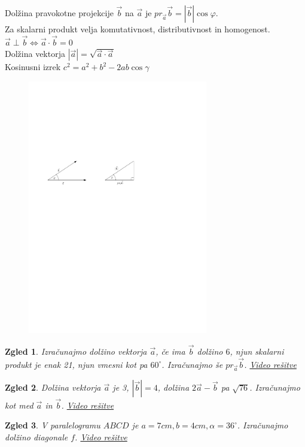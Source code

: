 \documentclass{article}
\newtheorem*{zgled}{Zgled}
\begin{document}
Dolžina pravokotne projekcije $\vec{b}$ na $\vec{a}$ je $pr_{\vec{a}}\vec{b}=|\vec{b}|\cos\varphi$.\\

Za skalarni produkt velja komutativnost, distributivnost in homogenost.\\

$\vec{a} \perp\vec{b} \iff \vec{a}\cdot\vec{b}=0$\\

Dolžina vektorja $|\vec{a}|=\sqrt{\vec{a}\cdot\vec{a}}$\\

Kosinusni izrek $c^2=a^2+b^2-2ab\cos\gamma$

\begin{figure}[H]
\includegraphics[width=0.7\textwidth]{skalarnu.produkt.pdf}
\centering
\end{figure}

\begin{zgled}
    Izračunajmo dolžino vektorja $\vec{a}$, če ima $\vec{b}$ dolžino $6$, njun skalarni produkt je enak 21, njun vmesni kot pa $60^\circ$. Izračunajmo še $pr_{\vec{a}}\vec{b}$.
    \href{https://youtu.be/PCUppodHkyY}{Video rešitve}
\end{zgled}
\begin{zgled}
    Dolžina vektorja $\vec{a}$ je 3, $|\vec{b}|=4$, dolžina $2\vec{a}-\vec{b}$ pa $\sqrt{76}$. Izračunajmo kot med $\vec{a}$ in $\vec{b}$.
    \href{https://youtu.be/xMxlB981-ek}{Video rešitve}
\end{zgled}
\begin{zgled}
    V paralelogramu $ABCD$ je $a=7cm, b=4cm, \alpha=36^\circ$. Izračunajmo dolžino diagonale $f$.
    \href{https://youtu.be/cA2GKU8gsrw}{Video rešitve}
\end{zgled}
\end{document}
